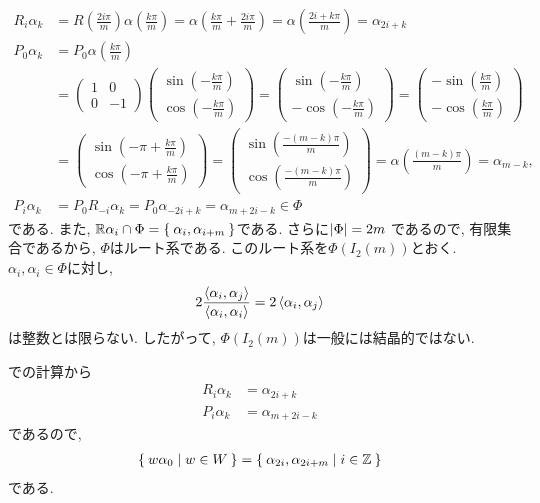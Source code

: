 \begin{align*}
  R_i\alpha_k
  &=R\left(\frac{2i\pi}{m}\right)\alpha(\frac{k\pi}{m})
  =\alpha(\frac{k\pi}{m}+\frac{2i\pi}{m})
  =\alpha(\frac{2i+k\pi}{m})
  =\alpha_{2i+k}\\
  P_0\alpha_k&=P_0\alpha(\frac{k\pi}{m})\\
  &=
  \begin{pmatrix}
    1 & 0 \\
    0 & -1
  \end{pmatrix}
  \begin{pmatrix}
    \sin(-\frac{k\pi}{m}) \\
    \cos(-\frac{k\pi}{m}) 
  \end{pmatrix}
=  \begin{pmatrix}
    \sin(-\frac{k\pi}{m}) \\
    -\cos(-\frac{k\pi}{m}) 
  \end{pmatrix}
=
 \begin{pmatrix}
    -\sin(\frac{k\pi}{m}) \\
    -\cos(\frac{k\pi}{m}) 
 \end{pmatrix}\\
&=
 \begin{pmatrix}
    \sin(-\pi+\frac{k\pi}{m}) \\
    \cos(-\pi+\frac{k\pi}{m}) 
 \end{pmatrix}
=
 \begin{pmatrix}
    \sin(\frac{-(m-k)\pi}{m}) \\
    \cos(\frac{-(m-k)\pi}{m}) 
 \end{pmatrix}
 =\alpha\left(\frac{(m-k)\pi}{m}\right)
 =\alpha_{m-k},
\\
P_i\alpha_k&=P_0R_{-i}\alpha_k
=P_0\alpha_{-2i+k}
=\alpha_{m+2i-k} \in \Phi
\end{align*}
である.
また,
$\mathbb{R}\alpha_i \cap \Phi=\Set{\alpha_i,\alpha_{i+m}}$である.
さらに$\left|\Phi\right|=2m$
であるので, 有限集合であるから,
$\Phi$はルート系である.
このルート系を$\Phi(I_2(m))$とおく.
$\alpha_i,\alpha_i\in\Phi$に対し,
\begin{align*}
  2\frac{\Braket{\alpha_i,\alpha_j}}{\Braket{\alpha_i,\alpha_i}}=2\Braket{\alpha_i,\alpha_j}
\end{align*}
は整数とは限らない.
したがって, $\Phi(I_2(m))$は一般には結晶的ではない.

での計算から
\begin{align*}
  R_i\alpha_k& =\alpha_{2i+k}\\
  P_i\alpha_k&=\alpha_{m+2i-k}
\end{align*}
であるので,
\begin{align*}
\Set{w\alpha_0 | w\in W} = \Set{\alpha_{2i}, \alpha_{2i+m}| i \in \mathbb{Z}}
\end{align*}
である.

